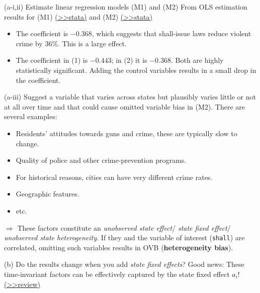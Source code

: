 \documentclass[
  10pt,
  ignorenonframetext,
]{beamer}
\begin{document}
\begin{frame}{(a-i,ii) Estimate linear regression models (M1) and (M2)}
\protect\hypertarget{Ex1-pooledOLS-A}{}
From OLS estimation results for (M1)
\footnotesize \protect\hyperlink{Ex1-pooledsimple}{(\textgreater\textgreater stata)}
\normalsize and (M2)
\footnotesize \protect\hyperlink{Ex1-pooledwithctrls}{(\textgreater\textgreater stata)}
\normalsize

\begin{itemize}
\item
  The coefficient is \(-0.368\), which suggests that shall-issue laws
  reduce violent crime by \(36\%\). This is a large effect.
\item
  The coefficient in (1) is \(-0.443\); in (2) it is \(-0.368\). Both
  are highly statistically significant. Adding the control variables
  results in a small drop in the coefficient.
\end{itemize}
\end{frame}

\begin{frame}[fragile]{(a-iii) Suggest a variable that varies across
states but plausibly varies little or not at all over time and that
could cause omitted variable bias in (M2).}
\protect\hypertarget{a-iii-suggest-a-variable-that-varies-across-states-but-plausibly-varies-little-or-not-at-all-over-time-and-that-could-cause-omitted-variable-bias-in-m2.}{}
There are several examples:

\begin{itemize}
\item
  Residents' attitudes towards guns and crime, these are typically slow
  to change.
\item
  Quality of police and other crime-prevention programs.
\item
  For historical reasons, cities can have very different crime rates.
\item
  Geographic features.
\item
  etc.
\end{itemize}

\(\Longrightarrow\) These factors constitute an \emph{unobserved state
effect}/ \emph{state fixed effect}/ \emph{unobserved state
heterogeneity}. If they and the variable of interest (\texttt{shall})
are correlated, omitting such variables results in OVB
(\textbf{heterogeneity bias}).
\end{frame}

\begin{frame}{(b) Do the results change when you add \emph{state fixed
effects}?}
\protect\hypertarget{b-do-the-results-change-when-you-add-state-fixed-effects}{}
Good news: These time-invariant factors can be effectively captured by
the state fixed effect \(a_i\)!
\footnotesize \protect\hyperlink{EntityFEs}{(\textgreater\textgreater review)}
\normalsize
\end{frame}
\end{document}
